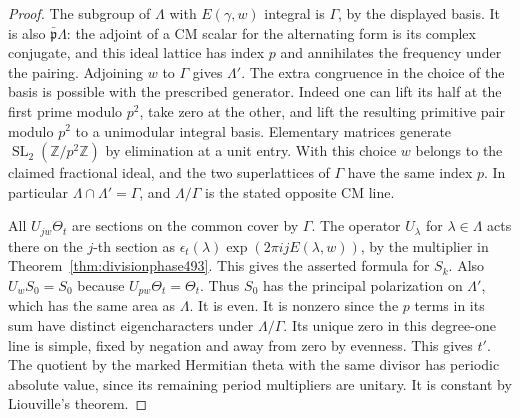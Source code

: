 \documentclass[a4paper,11pt]{article}
\theoremstyle{definition}
\theoremstyle{remark}
\numberwithin{equation}{section}
\begin{document}
\begin{proof}
The subgroup of \(\Lambda\) with \(E(\gamma,w)\) integral is
\(\Gamma\), by the displayed basis. It is also
\(\bar{\mathfrak p}\Lambda\): the adjoint of a CM scalar for
the alternating form is its complex conjugate, and this ideal
lattice has index \(p\) and annihilates the frequency under
the pairing. Adjoining \(w\) to \(\Gamma\) gives \(\Lambda'\).
The extra congruence in the choice of the basis is possible
with the prescribed generator. Indeed one can
lift its half at the first prime modulo \(p^2\), take zero at
the other, and lift the resulting primitive pair modulo \(p^2\)
to a unimodular integral basis. Elementary matrices generate
\(\operatorname{SL}_2(\mathbb Z/p^2\mathbb Z)\) by elimination
at a unit entry. With this choice \(w\) belongs to the claimed
fractional ideal, and the two superlattices of \(\Gamma\) have
the same index \(p\). In particular
\(\Lambda\cap\Lambda'=\Gamma\), and \(\Lambda/\Gamma\) is the
stated opposite CM line.

All \(U_{jw}\Theta_t\) are sections on the common cover by
\(\Gamma\). The operator \(U_\lambda\) for \(\lambda\in\Lambda\)
acts there on the \(j\)-th section as
\(\epsilon_t(\lambda)\exp(2\pi ijE(\lambda,w))\), by the
multiplier in Theorem~\ref{thm:divisionphase493}. This gives
the asserted formula for \(S_k\). Also \(U_w S_0=S_0\) because
\(U_{pw}\Theta_t=\Theta_t\). Thus \(S_0\) has the principal
polarization on \(\Lambda'\), which has the same area as
\(\Lambda\). It is even. It is nonzero since the \(p\) terms
in its sum have distinct eigencharacters under \(\Lambda/\Gamma\).
Its unique zero in this degree-one line is simple, fixed by
negation and away from zero by evenness. This gives \(t'\).
The quotient by the marked Hermitian theta with the same
divisor has periodic absolute value, since its remaining
period multipliers are unitary. It is constant by Liouville's
theorem.


\end{proof}
\end{document}
